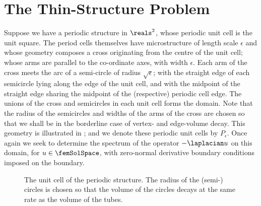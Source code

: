 \section{The Thin-Structure Problem} \label{sec:ThinStrucProblem}
Suppose we have a periodic structure in $\reals^{2}$, whose periodic unit cell is the unit square.
The period cells themselves have microstructure of length scale $\epsilon$ and whose geometry composes a cross originating from the centre of the unit cell; whose arms are parallel to the co-ordinate axes, with width $\epsilon$.
Each arm of the cross meets the arc of a semi-circle of radius $\sqrt{\epsilon}$; with the straight edge of each semicircle lying along the edge of the unit cell, and with the midpoint of the straight edge sharing the midpoint of the (respective) periodic cell edge.
The unions of the cross and semicircles in each unit cell forms the domain.
Note that the radius of the semicircles and widths of the arms of the cross are chosen so that we shall be in the borderline case of vertex- and edge-volume decay.
This geometry is illustrated in ; and we denote these periodic unit cells by $P_{\epsilon}$.
Once again we seek to determine the spectrum of the operator $-\laplacian u$ on this domain, for $u\in\femSolSpace$, with zero-normal derivative boundary conditions imposed on the boundary.
\begin{figure}[b!]
	\centering
	\caption{The unit cell of the periodic structure. The radius of the (semi-) circles is chosen so that the volume of the circles decays at the same rate as the volume of the tubes.\label{fig:HomogenisationProblemUnitCell}}
\end{figure} \newline

